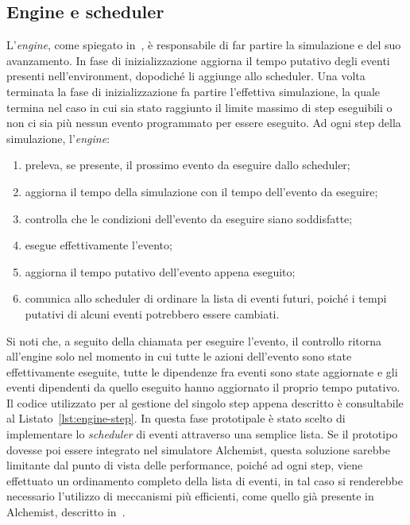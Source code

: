 \documentclass[12pt,a4paper,openright,twoside]{book}
\begin{document}
\subsection{Engine e scheduler}
L'\textit{engine}, come spiegato in~, è responsabile di far partire la simulazione e del suo avanzamento. In fase di inizializzazione aggiorna il tempo putativo degli eventi presenti nell'environment, dopodiché li aggiunge allo scheduler. 
Una volta terminata la fase di inizializzazione fa partire l'effettiva simulazione, la quale termina nel caso in cui sia stato raggiunto il limite massimo di step eseguibili o non ci sia più nessun evento programmato per essere eseguito. 
Ad ogni step della simulazione, l'\textit{engine}:
\begin{enumerate}
    \item preleva, se presente, il prossimo evento da eseguire dallo scheduler;
    \item aggiorna il tempo della simulazione con il tempo dell'evento da eseguire;
    \item controlla che le condizioni dell'evento da eseguire siano soddisfatte;
    \item esegue effettivamente l'evento;
    \item aggiorna il tempo putativo dell'evento appena eseguito;
    \item comunica allo scheduler di ordinare la lista di eventi futuri, poiché i tempi putativi di alcuni eventi potrebbero essere cambiati. 
\end{enumerate}
Si noti che, a seguito della chiamata per eseguire l'evento, il controllo ritorna all'engine solo nel momento in cui tutte le azioni dell'evento sono state effettivamente eseguite, tutte le dipendenze fra eventi sono state aggiornate e gli eventi dipendenti da quello eseguito hanno aggiornato il proprio tempo putativo. 
Il codice utilizzato per al gestione del singolo step appena descritto è consultabile al Listato~\ref{lst:engine-step}. 
In questa fase prototipale è stato scelto di implementare lo \textit{scheduler} di eventi attraverso una semplice lista. Se il prototipo dovesse poi essere integrato nel simulatore Alchemist, questa soluzione sarebbe limitante dal punto di vista delle performance, poiché ad ogni step, viene effettuato un ordinamento completo della lista di eventi, in tal caso si renderebbe necessario l'utilizzo di meccanismi più efficienti, come quello già presente in Alchemist, descritto in~.


\end{document}
